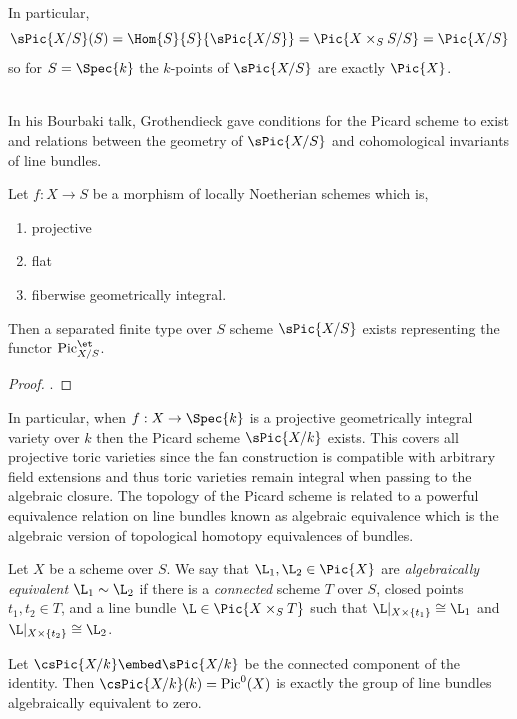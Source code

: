 \begin{rmk}
In particular, 
\[ \sPic{X/S}(S) = \Hom{S}{S}{\sPic{X/S}} = \Pic{X \times_S S / S} = \Pic{X/S} \]
so for $S = \Spec{k}$ the $k$-points of $\sPic{X/S}$ are exactly $\Pic{X}$. 
\end{rmk}
\noindent\\
In his Bourbaki talk, Grothendieck gave conditions for the Picard scheme to exist and relations between the geometry of $\sPic{X/S}$ and cohomological invariants of line bundles.

\begin{theorem}
Let $f : X \to S$ be a morphism of locally Noetherian schemes which is,
\begin{enumerate}
\item projective
\item flat
\item fiberwise geometrically integral. 
\end{enumerate}
Then a separated finite type over $S$ scheme $\sPic{X/S}$ exists representing the functor $\mathrm{Pic}^{\et}_{X/S}$.
\end{theorem}

\begin{proof}
\cite[Thm. 3.1]{FGA}.
\end{proof}
\noindent
In particular, when $f : X \to \Spec{k}$ is a projective geometrically integral variety over $k$ then the Picard scheme $\sPic{X/k}$ exists. This covers all projective toric varieties since the fan construction is compatible with arbitrary field extensions and thus toric varieties remain integral when passing to the algebraic closure. The topology of the Picard scheme is related to a powerful equivalence relation on line bundles known as algebraic equivalence which is the algebraic version of topological homotopy equivalences of bundles.

\begin{defn}
Let $X$ be a scheme over $S$. We say that $\L_1, \L_2 \in \Pic{X}$ are \textit{algebraically equivalent} $\L_1 \sim \L_2$ if there is a \textit{connected} scheme $T$ over $S$, closed points $t_1, t_2 \in T$, and a line bundle $\L \in \Pic{X \times_S T}$ such that $\L |_{X \times \{t_1\}} \cong \L_1$ and $\L |_{X \times \{t_2\}} \cong \L_2$. 
\end{defn}

\begin{prop}
Let $\csPic{X/k} \embed \sPic{X/k}$ be the connected component of the identity. Then $\csPic{X/k}(k) = \mathrm{Pic}^0(X)$ is exactly the group of line bundles algebraically equivalent to zero. 
\end{prop}

